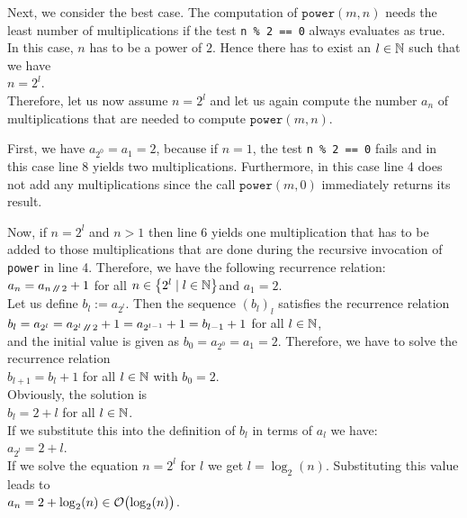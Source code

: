 Next, we consider the best case.  The computation of
$\mathtt{power}(m,n)$ needs the least number of multiplications if the test 
\texttt{n \% 2 == 0}
always evaluates as true.  In this case, $n$ has to be a power of $2$.  
Hence there has to exist an $l\in {\mathbb N}$ such that we have
 \\[0.2cm]
\hspace*{1.3cm} $n = 2^l$.
 \\[0.2cm]
Therefore, let us now assume $n = 2^l$ and let us again compute the number $a_n$ of multiplications
that are needed to compute $\mathtt{power}(m,n)$. 

First, we have $a_{2^0} = a_1 = 2$, because if $n = 1$, the test \texttt{n \% 2 == 0} fails and in
this case line 8 yields two multiplications.  Furthermore, in this case
line 4 does not add any multiplications since the call $\mathtt{power}(m,0)$ immediately returns its
result.

Now, if $n = 2^l$ and $n > 1$ then line 6 yields one multiplication that 
has to be added to those multiplications that are done during the recursive invocation of
\texttt{power} in line 4.  Therefore, we have the following recurrence relation:
 \\[0.2cm]
\hspace*{1.3cm} $a_n = a_{n \mbox{\scriptsize\,\texttt{/}$\!$\texttt{/}\,} 2} + 1$ \qquad for all $n \in \left\{2^l \mid l \in {\mathbb N}\right\}$\quad and
$a_1 = 2$. 
\\[0.2cm]
Let us define $b_l := a_{2^l}$.  Then the sequence $(b_l)_l$ satisfies the recurrence relation
 \\[0.2cm]
\hspace*{1.3cm} 
$b_l = a_{2^l} = a_{2^l \mbox{\scriptsize\,\texttt{/}$\!$\texttt{/}\,} 2} + 1 = a_{2^{l-1}} + 1 = b_{l-1} + 1$ \qquad for all $l\in{\mathbb N}$, \\[0.2cm]
and the initial value is given as $b_0 = a_{2^0} = a_1 = 2$.
Therefore, we have to solve the recurrence relation 
\\[0.2cm]
\hspace*{1.3cm}
 $b_{l+1} = b_l + 1$ \qquad for all $l \in {\mathbb N}$ \quad with $b_0 = 2$.\\[0.2cm]
Obviously, the solution is \\[0.2cm]
\hspace*{1.3cm} $b_l = 2 + l$ \qquad for all $l\in{\mathbb N}$.
\\[0.2cm]
If we substitute this into the definition of $b_l$ in terms of $a_l$ we have: \\[0.2cm]
\hspace*{1.3cm}
$a_{2^l} = 2 + l$. 
\\[0.2cm]
If we solve the equation $n = 2^l$ for  $l$ we get $l =
\log_2(n)$. Substituting this value leads to
\\[0.2cm]
\hspace*{1.3cm}
 $a_n = 2 + \log_2(n) \in \mathcal{O}\bigl(\log_2(n)\bigr)$.
\vspace*{0.3cm}

